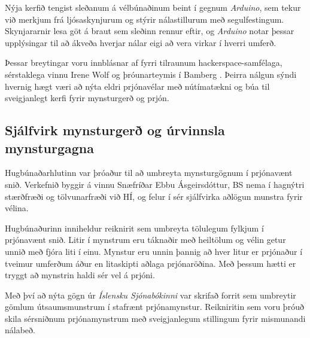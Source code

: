 \documentclass[a4paper,12pt]{article}
\begin{document}
Nýja kerfið tengist sleðanum á vélbúnaðinum beint í gegnum \emph{Arduino}, sem tekur
við merkjum frá ljósaskynjurum og stýrir nálastillurum með segulfestingum.
Skynjararnir lesa göt á braut sem sleðinn rennur eftir, og \emph{Arduino} notar þessar
upplýsingar til að ákveða hverjar nálar eigi að vera virkar í hverri umferð. 

Þessar breytingar voru innblásnar af fyrri tilraunum hackerspace-samfélaga,
sérstaklega vinnu Irene Wolf og þróunarteymis í Bamberg \cite{wolf, bamberg}.
Þeirra nálgun sýndi hvernig hægt væri að nýta eldri prjónavélar með nútímatækni og
búa til sveigjanlegt kerfi fyrir mynsturgerð og prjón.

\subsection{Sjálfvirk mynsturgerð og úrvinnsla mynsturgagna}
Hugbúnaðarhlutinn var þróaður til að umbreyta mynsturgögnum í prjónavænt snið.
Verkefnið byggir á vinnu Snæfríðar Ebbu Ásgeirsdóttur, BS nema í hagnýtri stærðfræði
og tölvunarfræði við HÍ, og felur í sér sjálfvirka aðlögun munstra fyrir vélina.

Hugbúnaðurinn inniheldur reiknirit sem umbreyta tölulegum fylkjum í prjónavænt snið.
Litir í mynstrum eru táknaðir með heiltölum og vélin getur unnið með fjóra liti í einu.
Mynstur eru unnin þannig að hver litur er prjónaður í tveimur umferðum áður en litaskipti
aðlaga prjónaröðina. Með þessum hætti er tryggt að mynstrin haldi sér vel á prjóni.

Með því að nýta gögn úr \emph{Íslensku Sjónabókinni} \cite{sjonabok} var skrifað forrit
sem umbreytir gömlum útsaumsmunstrum í stafrænt prjónamynstur. Reikniritin sem voru þróuð
skila sérsniðnum prjónamynstrum með sveigjanlegum stillingum fyrir mismunandi nálabeð.
\end{document}
